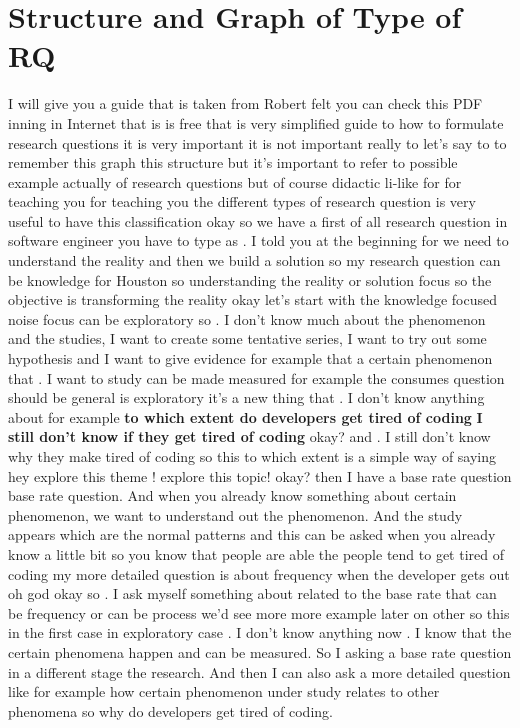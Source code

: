 \documentclass[conference, compsoc, twoside]{IEEEtran}
\begin{document}
\section{Structure and Graph of Type of RQ} %
\label{sec:structure_and_graph_of_type_of_rq}

I will give you a guide that is taken from Robert felt you can check this PDF inning in Internet that is is free that is very simplified guide to how to formulate research questions it is very important it is not important really to let's say to to remember this graph this structure but it's important to refer to possible example actually of research questions but of course didactic li-like for for teaching you for teaching you the different types of research question is very useful to have this classification okay so we have a first of all research question in software engineer you have to type as .
I told you at the beginning for we need to understand the reality and then we build a solution so my research question can be knowledge for Houston so understanding the reality or solution focus so the objective is transforming the reality okay let's start with the knowledge focused noise focus can be exploratory so .
I don't know much about the phenomenon and the studies,
I want to create some tentative series,
I want to try out some hypothesis and
I want to give evidence for example that a certain phenomenon that .
I want to study can be made measured for example the consumes question should be general is exploratory it's a new thing that .
I don't know anything about for example \textbf{to which extent do developers get tired of coding} 
\textbf{I still don't know if they get tired of coding} okay? and .
I still don't know why they make tired of coding so this to which extent is a simple way of saying hey explore this theme ! explore this topic! okay? then I have a base rate question base rate question.
And when you already know something about certain phenomenon, 
we want to understand out the phenomenon. 
And the study appears which are the normal patterns and this can be asked when you already know a little bit so you know that people are able the people tend to get tired of coding my more detailed question is about frequency when the developer gets out oh god okay so .
I ask myself something about related to the base rate that can be frequency or can be process we'd see more more example later on other so this in the first case in exploratory case .
I don't know anything now .
I know that the certain phenomena happen and can be measured. 
So I asking a base rate question in a different stage the research.
And then I can also ask a more detailed question like for example how certain phenomenon under study relates to other phenomena so why do developers get tired of coding. 
\end{document}
